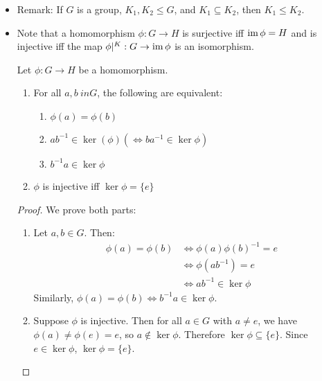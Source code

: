 \begin{itemize}
\begin{enumerate}
    \end{enumerate}
    \item Remark: If $G$ is a group, $K_1,K_2 \le G$, and $K_1 \subseteq K_2$, then $K_1 \le K_2$.
    \item Note that a homomorphism $\phi:G\rightarrow H$ is surjective iff $\operatorname{im} \phi = H$ and is injective iff the map $\phi|^K:G\rightarrow \operatorname{im}\phi$ is an isomorphism.
    \begin{proposition}
        Let $\phi:G\rightarrow H$ be a homomorphism.
        \begin{enumerate}
            \item For all $a,b\ in G$, the following are equivalent:
            \begin{enumerate}
                \item $\phi(a) = \phi(b)$
                \item $ab^{-1} \in \ker(\phi) (\iff ba^{-1} \in \ker\phi)$
                \item $b^{-1}a \in \ker\phi$
            \end{enumerate}
            \item $\phi$ is injective iff $\ker\phi = \{e\}$
        \end{enumerate}
    \end{proposition}
    \begin{proof}
        We prove both parts:
        \begin{enumerate}
            \item Let $a,b\in G$. Then:
            \begin{align}
                \phi(a) = \phi(b) &\iff \phi(a)\phi(b)^{-1} = e\\ 
                &\iff \phi(ab^{-1}) = e \\ 
                &\iff ab^{-1} \in \ker\phi 
            \end{align}
            Similarly, $\phi(a)=\phi(b) \iff b^{-1}a \in \ker\phi$.
            \item Suppose $\phi$ is injective. Then for all $a\in G$ with $a\neq e$, we have $\phi(a) \neq \phi(e)=e$, so $a \notin \ker \phi$. Therefore $\ker\phi \subseteq \{e\}$. Since $e \in \ker\phi$, $\ker\phi = \{e\}$.
            

\end{enumerate}
\end{proof}
\end{itemize}
